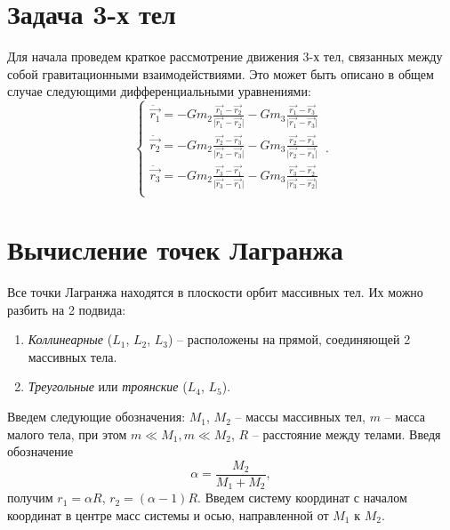 \documentclass[12pt]{article}
\begin{document}
    \section{Задача 3-х тел}
    Для начала проведем краткое рассмотрение движения 3-х тел, связанных между
    собой гравитационными взаимодействиями. Это может быть описано в общем
    случае следующими дифференциальными уравнениями:
    \begin{equation}
        \begin{cases}
            \ddot{\vec{r_1}} = -Gm_2\frac{\vec{r_1} - \vec{r_2}}
            {\lvert \vec{r_1} - \vec{r_2} \rvert} -
            Gm_3\frac{\vec{r_1} - \vec{r_3}}{\lvert \vec{r_1} - 
            \vec{r_3} \rvert}\\
            \ddot{\vec{r_2}} = -Gm_2\frac{\vec{r_2} - \vec{r_3}}
            {\lvert \vec{r_2} - \vec{r_3} \rvert} -
            Gm_3\frac{\vec{r_2} - \vec{r_1}}{\lvert \vec{r_2} - 
            \vec{r_1} \rvert}\\
            \ddot{\vec{r_3}} = -Gm_2\frac{\vec{r_3} - \vec{r_1}}
            {\lvert \vec{r_3} - \vec{r_1} \rvert} -
            Gm_3\frac{\vec{r_3} - \vec{r_2}}{\lvert \vec{r_3} - 
            \vec{r_2} \rvert}\\
        \end{cases}\,.
    \end{equation}

    \section{Вычисление точек Лагранжа}
    Все точки Лагранжа находятся в плоскости орбит массивных тел. Их можно
    разбить на 2 подвида:
    \begin{enumerate}
        \item \textit{Коллинеарные} ($L_1$, $L_2$, $L_3$) -- расположены на прямой,
        соединяющей 2 массивных тела.
        \item \textit{Треугольные} или \textit{троянские} ($L_4$, $L_5$).
    \end{enumerate}
    \par Введем следующие обозначения: $M_1$, $M_2$ -- массы массивных тел,
    $m$ -- масса малого тела, при этом $m \ll M_1, m \ll M_2$, $R$ -- расстояние
    между телами.
    Введя обозначение
    $$ \alpha = \frac{M_2}{M_1 + M_2}, $$
    получим $r_1 = \alpha R$, $r_2 = (\alpha - 1)R$.
    Введем систему координат с началом координат в центре масс системы
    и осью, направленной от $M_1$ к $M_2$.
\end{document}
